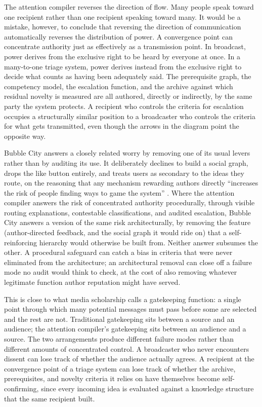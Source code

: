 \documentclass[11pt]{article}
\begin{document}
The attention compiler reverses the direction of flow. Many people speak toward one recipient rather than one recipient speaking toward many. It would be a mistake, however, to conclude that reversing the direction of communication automatically reverses the distribution of power. A convergence point can concentrate authority just as effectively as a transmission point. In broadcast, power derives from the exclusive right to be heard by everyone at once. In a many-to-one triage system, power derives instead from the exclusive right to decide what counts as having been adequately said. The prerequisite graph, the competency model, the escalation function, and the archive against which residual novelty is measured are all authored, directly or indirectly, by the same party the system protects. A recipient who controls the criteria for escalation occupies a structurally similar position to a broadcaster who controls the criteria for what gets transmitted, even though the arrows in the diagram point the opposite way.

Bubble City answers a closely related worry by removing one of its usual levers rather than by auditing its use. It deliberately declines to build a social graph, drops the like button entirely, and treats users as secondary to the ideas they route, on the reasoning that any mechanism rewarding authors directly ``increases the risk of people finding ways to game the system'' \cite{anderson2022bubblecity}. Where the attention compiler answers the risk of concentrated authority procedurally, through visible routing explanations, contestable classifications, and audited escalation, Bubble City answers a version of the same risk architecturally, by removing the feature (author-directed feedback, and the social graph it would ride on) that a self-reinforcing hierarchy would otherwise be built from. Neither answer subsumes the other. A procedural safeguard can catch a bias in criteria that were never eliminated from the architecture; an architectural removal can close off a failure mode no audit would think to check, at the cost of also removing whatever legitimate function author reputation might have served.

This is close to what media scholarship calls a gatekeeping function: a single point through which many potential messages must pass before some are selected and the rest are not. Traditional gatekeeping sits between a source and an audience; the attention compiler's gatekeeping sits between an audience and a source. The two arrangements produce different failure modes rather than different amounts of concentrated control. A broadcaster who never encounters dissent can lose track of whether the audience actually agrees. A recipient at the convergence point of a triage system can lose track of whether the archive, prerequisites, and novelty criteria it relies on have themselves become self-confirming, since every incoming idea is evaluated against a knowledge structure that the same recipient built.
\end{document}
